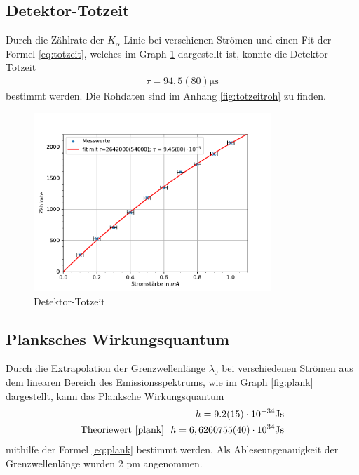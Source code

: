 \documentclass[11pt, a4paper]{article}
\begin{document}
    \subsection{Detektor-Totzeit}
    Durch die Zählrate der $K_{\alpha}$ Linie bei verschienen Strömen und einen Fit der Formel \ref{eq:totzeit}, welches im Graph \ref{fig:totzeit} dargestellt ist, konnte die Detektor-Totzeit
    \begin{align}
        \tau = 94,5(80) \si{\micro\second}
    \end{align}
    bestimmt werden. Die Rohdaten sind im Anhang \ref{fig:totzeitroh} zu finden.

    \begin{figure}
        \centering
        \includegraphics[width=0.8\textwidth]{Detektortotzeit.pdf}
        \caption{Detektor-Totzeit}
        \label{fig:totzeit}
    \end{figure}

    \subsection{Planksches Wirkungsquantum}

    Durch die Extrapolation der Grenzwellenlänge $\lambda_0$ bei verschiedenen Strömen aus dem linearen Bereich des Emissionsspektrums, wie im Graph \ref{fig:plank} dargestellt, kann das Planksche Wirkungsquantum
    \begin{align}
        h = 9.2(15) \cdot 10^{-34} \text{Js} \\
        \text{Theoriewert \cite{plank}} \ \  h = 6,6260755(40) \cdot 10^{34} \text{Js}
    \end{align}
    mithilfe der Formel \ref{eq:plank} bestimmt werden. Als Ableseungenauigkeit der Grenzwellenlänge wurden $2$ pm angenommen.
\end{document}
